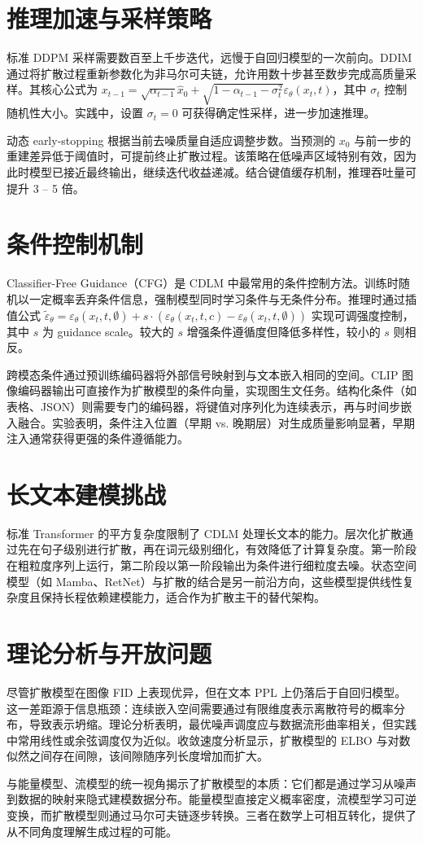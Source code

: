 \chapter{推理加速与采样策略}
标准 DDPM 采样需要数百至上千步迭代，远慢于自回归模型的一次前向。DDIM 通过将扩散过程重新参数化为非马尔可夫链，允许用数十步甚至数步完成高质量采样。其核心公式为 $x_{t-1}=\sqrt{\alpha_{t-1}}\hat x_0 + \sqrt{1-\alpha_{t-1}-\sigma_t^2}\varepsilon_\theta(x_t,t)$，其中 $\sigma_t$ 控制随机性大小。实践中，设置 $\sigma_t=0$ 可获得确定性采样，进一步加速推理。\par
动态 early-stopping 根据当前去噪质量自适应调整步数。当预测的 $x_0$ 与前一步的重建差异低于阈值时，可提前终止扩散过程。该策略在低噪声区域特别有效，因为此时模型已接近最终输出，继续迭代收益递减。结合键值缓存机制，推理吞吐量可提升 3 – 5 倍。\par
\chapter{条件控制机制}
Classifier-Free Guidance（CFG）是 CDLM 中最常用的条件控制方法。训练时随机以一定概率丢弃条件信息，强制模型同时学习条件与无条件分布。推理时通过插值公式 $\tilde\varepsilon_\theta=\varepsilon_\theta(x_t,t,\emptyset)+s\cdot(\varepsilon_\theta(x_t,t,c)-\varepsilon_\theta(x_t,t,\emptyset))$ 实现可调强度控制，其中 $s$ 为 guidance scale。较大的 $s$ 增强条件遵循度但降低多样性，较小的 $s$ 则相反。\par
跨模态条件通过预训练编码器将外部信号映射到与文本嵌入相同的空间。CLIP 图像编码器输出可直接作为扩散模型的条件向量，实现图生文任务。结构化条件（如表格、JSON）则需要专门的编码器，将键值对序列化为连续表示，再与时间步嵌入融合。实验表明，条件注入位置（早期 vs. 晚期层）对生成质量影响显著，早期注入通常获得更强的条件遵循能力。\par
\chapter{长文本建模挑战}
标准 Transformer 的平方复杂度限制了 CDLM 处理长文本的能力。层次化扩散通过先在句子级别进行扩散，再在词元级别细化，有效降低了计算复杂度。第一阶段在粗粒度序列上运行，第二阶段以第一阶段输出为条件进行细粒度去噪。状态空间模型（如 Mamba、RetNet）与扩散的结合是另一前沿方向，这些模型提供线性复杂度且保持长程依赖建模能力，适合作为扩散主干的替代架构。\par
\chapter{理论分析与开放问题}
尽管扩散模型在图像 FID 上表现优异，但在文本 PPL 上仍落后于自回归模型。这一差距源于信息瓶颈：连续嵌入空间需要通过有限维度表示离散符号的概率分布，导致表示坍缩。理论分析表明，最优噪声调度应与数据流形曲率相关，但实践中常用线性或余弦调度仅为近似。收敛速度分析显示，扩散模型的 ELBO 与对数似然之间存在间隙，该间隙随序列长度增加而扩大。\par
与能量模型、流模型的统一视角揭示了扩散模型的本质：它们都是通过学习从噪声到数据的映射来隐式建模数据分布。能量模型直接定义概率密度，流模型学习可逆变换，而扩散模型则通过马尔可夫链逐步转换。三者在数学上可相互转化，提供了从不同角度理解生成过程的可能。\par
